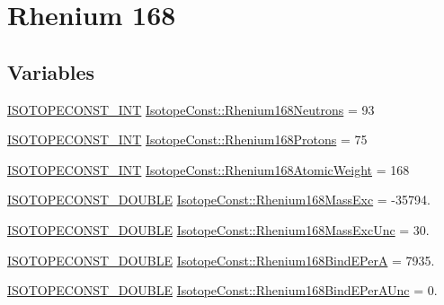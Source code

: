 \hypertarget{group___isotope_const-_rhenium-_re168}{}\section{Rhenium 168}
\label{group___isotope_const-_rhenium-_re168}
\subsection*{Variables}
\begin{DoxyCompactItemize}
\item 
\mbox{\hyperlink{group___isotope_const-_macros_ga5f18360b3e99483a35c32d789e62621c}{I\+S\+O\+T\+O\+P\+E\+C\+O\+N\+S\+T\+\_\+\+I\+NT}} \mbox{\hyperlink{group___isotope_const-_rhenium-_re168_gabc51b2d3747ca9aaefa3123356f700ca}{Isotope\+Const\+::\+Rhenium168\+Neutrons}} = 93
\item 
\mbox{\hyperlink{group___isotope_const-_macros_ga5f18360b3e99483a35c32d789e62621c}{I\+S\+O\+T\+O\+P\+E\+C\+O\+N\+S\+T\+\_\+\+I\+NT}} \mbox{\hyperlink{group___isotope_const-_rhenium-_re168_ga8e38599e8e05475f6e0c363c5b3ef98e}{Isotope\+Const\+::\+Rhenium168\+Protons}} = 75
\item 
\mbox{\hyperlink{group___isotope_const-_macros_ga5f18360b3e99483a35c32d789e62621c}{I\+S\+O\+T\+O\+P\+E\+C\+O\+N\+S\+T\+\_\+\+I\+NT}} \mbox{\hyperlink{group___isotope_const-_rhenium-_re168_gab79878bcc2d55ced5d3a5346a87dc7cb}{Isotope\+Const\+::\+Rhenium168\+Atomic\+Weight}} = 168
\item 
\mbox{\hyperlink{group___isotope_const-_macros_ga8f45a7272ce02c0b4c65c44636ed719a}{I\+S\+O\+T\+O\+P\+E\+C\+O\+N\+S\+T\+\_\+\+D\+O\+U\+B\+LE}} \mbox{\hyperlink{group___isotope_const-_rhenium-_re168_ga28ca4cb28f5745cd65079990032e2e33}{Isotope\+Const\+::\+Rhenium168\+Mass\+Exc}} = -\/35794.
\item 
\mbox{\hyperlink{group___isotope_const-_macros_ga8f45a7272ce02c0b4c65c44636ed719a}{I\+S\+O\+T\+O\+P\+E\+C\+O\+N\+S\+T\+\_\+\+D\+O\+U\+B\+LE}} \mbox{\hyperlink{group___isotope_const-_rhenium-_re168_gaa5b128af90213c085656303fe72d94f8}{Isotope\+Const\+::\+Rhenium168\+Mass\+Exc\+Unc}} = 30.
\item 
\mbox{\hyperlink{group___isotope_const-_macros_ga8f45a7272ce02c0b4c65c44636ed719a}{I\+S\+O\+T\+O\+P\+E\+C\+O\+N\+S\+T\+\_\+\+D\+O\+U\+B\+LE}} \mbox{\hyperlink{group___isotope_const-_rhenium-_re168_gabaa4d07d36b1e96c9332840d11b9b2c1}{Isotope\+Const\+::\+Rhenium168\+Bind\+E\+PerA}} = 7935.
\item 
\mbox{\hyperlink{group___isotope_const-_macros_ga8f45a7272ce02c0b4c65c44636ed719a}{I\+S\+O\+T\+O\+P\+E\+C\+O\+N\+S\+T\+\_\+\+D\+O\+U\+B\+LE}} \mbox{\hyperlink{group___isotope_const-_rhenium-_re168_gad7d1491bb29ac5d48e3ce3efd0b9373b}{Isotope\+Const\+::\+Rhenium168\+Bind\+E\+Per\+A\+Unc}} = 0.

\end{DoxyCompactItemize}
